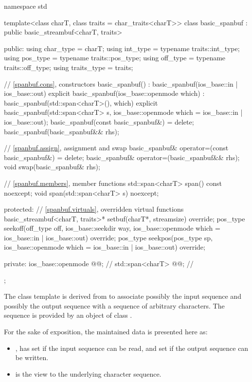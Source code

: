 %
\begin{codeblock}
namespace std {
  template<class charT, class traits = char_traits<charT>>
  class basic_spanbuf
    : public basic_streambuf<charT, traits> {
  public:
    using char_type   = charT;
    using int_type    = typename traits::int_type;
    using pos_type    = typename traits::pos_type;
    using off_type    = typename traits::off_type;
    using traits_type = traits;

    // \ref{spanbuf.cons}, constructors
    basic_spanbuf() : basic_spanbuf(ios_base::in | ios_base::out) {}
    explicit basic_spanbuf(ios_base::openmode which)
      : basic_spanbuf(std::span<charT>(), which) {}
    explicit basic_spanbuf(std::span<charT> s,
                           ios_base::openmode which = ios_base::in | ios_base::out);
    basic_spanbuf(const basic_spanbuf&) = delete;
    basic_spanbuf(basic_spanbuf&& rhs);

    // \ref{spanbuf.assign}, assignment and swap
    basic_spanbuf& operator=(const basic_spanbuf&) = delete;
    basic_spanbuf& operator=(basic_spanbuf&& rhs);
    void swap(basic_spanbuf& rhs);

    // \ref{spanbuf.members}, member functions
    std::span<charT> span() const noexcept;
    void span(std::span<charT> s) noexcept;

  protected:
    // \ref{spanbuf.virtuals}, overridden virtual functions
    basic_streambuf<charT, traits>* setbuf(charT*, streamsize) override;
    pos_type seekoff(off_type off, ios_base::seekdir way,
                     ios_base::openmode which = ios_base::in | ios_base::out) override;
    pos_type seekpos(pos_type sp,
                     ios_base::openmode which = ios_base::in | ios_base::out) override;

  private:
    ios_base::openmode @@;            // \expos
    std::span<charT> @@;               // \expos
  };
}
\end{codeblock}

\pnum
The class template  is derived from 
to associate possibly the input sequence and possibly the output sequence
with a sequence of arbitrary characters.
The sequence is provided by an object of class .

\pnum
For the sake of exposition, the maintained data is presented here as:
\begin{itemize}
\item
{}, has
 set if the input sequence can be read, and
 set if the output sequence can be written.
\item
{} is the view to
the underlying character sequence.
\end{itemize}

